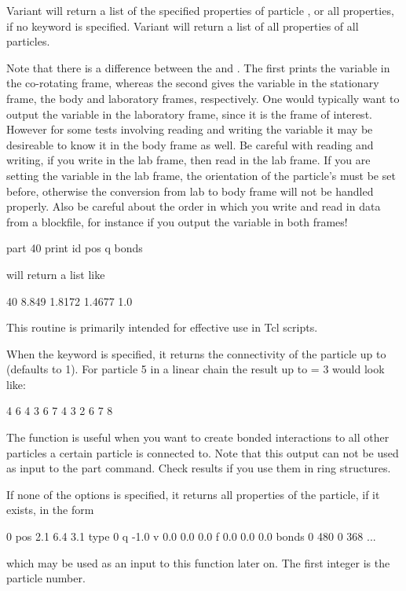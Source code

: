 Variant  will return a list of the specified properties of
particle , or all properties, if no keyword is
specified.  Variant  will return a list of all properties
of all particles.

Note that there is a difference between the  and
.  The first prints the variable in the co-rotating
frame, whereas the second gives the variable in the stationary frame,
the body and laboratory frames, respectively. One would typically want
to output the variable in the laboratory frame, since it is the frame
of interest. However for some tests involving reading and writing the
variable it may be desireable to know it in the body frame as well. Be
careful with reading and writing, if you write in the lab frame, then
read in the lab frame. If you are setting the variable in the lab
frame, the orientation of the particle's  must be set
before, otherwise the conversion from lab to body frame will not be
handled properly.  Also be careful about the order in which you write
and read in data from a blockfile, for instance if you output the
variable in both frames!

\begin{code}
part 40 print id pos q bonds
\end{code}
will return a list like
\begin{tclcode}
40 8.849 1.8172 1.4677 1.0 {}
\end{tclcode}
This routine is primarily intended for effective use in Tcl scripts.

When the keyword  is specified, it returns the
connectivity of the particle up to  (defaults to 1). For
particle 5 in a linear chain the result up to  = 3 would
look like:
\begin{tclcode}
{ { 4 } { 6 } } { { 4 3 } { 6 7 } } { {4 3 2 } { 6 7 8 } } 
\end{tclcode}
The function is useful when you want to create bonded interactions to
all other particles a certain particle is connected to. Note that this
output can not be used as input to the part command. Check results if
you use them in ring structures.

If none of the options is specified, it returns all properties of the
particle, if it exists, in the form
\begin{tclcode}
  0 pos 2.1 6.4 3.1 type 0 q -1.0 v 0.0 0.0 0.0 f 0.0 0.0 0.0
  bonds { {0 480} {0 368} ... } 
\end{tclcode}
which may be used as an input to this function later on. The first
integer is the particle number.

